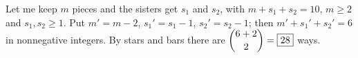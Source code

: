 Let me keep $m$ pieces and the sisters get $s_1$ and $s_2$, with $m+s_1+s_2=10$, $m\ge2$ and $s_1,s_2\ge1$. Put $m'=m-2$, $s_1'=s_1-1$, $s_2'=s_2-1$; then $m'+s_1'+s_2'=6$ in nonnegative integers. By stars and bars there are $\dbinom{6+2}{2}=\boxed{28}$ ways.
